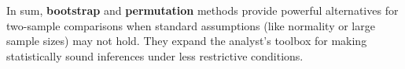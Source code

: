 \documentclass[10pt]{extarticle}
\begin{document}
In sum, \textbf{bootstrap} and \textbf{permutation} methods provide powerful alternatives for two-sample comparisons when standard assumptions (like normality or large sample sizes) may not hold. They expand the analyst’s toolbox for making statistically sound inferences under less restrictive conditions.
\end{document}
